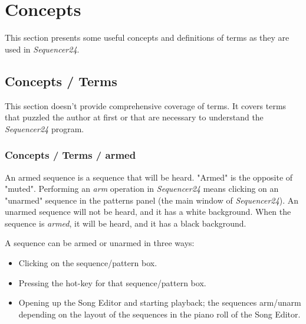 %
%
%

\section{Concepts}
\label{sec:concepts}

   This section presents some useful concepts and definitions of terms as
   they are used in \textsl{Sequencer24}.

\subsection{Concepts / Terms}
\label{subsec:concepts_terms}

   This section doesn't provide comprehensive coverage of terms.  It
   covers terms that puzzled the author at first or that are
   necessary to understand the \textsl{Sequencer24} program.

\subsubsection{Concepts / Terms / armed}
\label{subsubsec:concepts_terms_armed}

   An armed sequence is a sequence that will be heard.
   "Armed" is the opposite of "muted".
   Performing an \textsl{arm} operation in \textsl{Sequencer24} means clicking on
   an "unarmed" sequence in the patterns panel (the main window of
   \textsl{Sequencer24}).  An unarmed sequence will not be heard, and it
   has a white background.  When the sequence is \textsl{armed},
   it will be heard, and it has a black background.

   A sequence can be armed or unarmed in three ways:

   \begin{itemize}
      \item Clicking on the sequence/pattern box.
      \item Pressing the hot-key for that sequence/pattern box.
      \item Opening up the Song Editor and starting playback; the
            sequences arm/unarm depending on the layout of the
            sequences in the piano roll of the Song Editor.
   \end{itemize}

